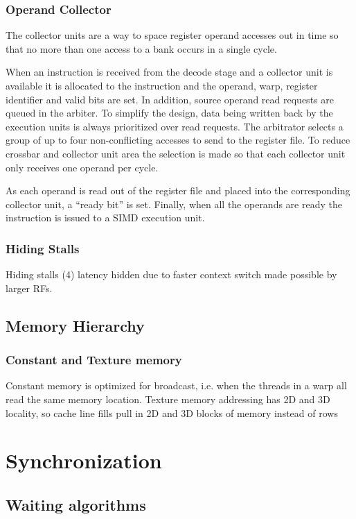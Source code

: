 \documentclass{article}
\begin{document}
\begin{multicols*}{2}
\subsubsection{Operand Collector}
The collector units are a way to space register operand accesses out in time so that no more than one access to a bank occurs in a single cycle. 
\medskip\par\noindent
When an instruction is received from the decode stage and a collector unit is available it is allocated to the instruction and the operand, warp, register identifier and valid bits are set. In addition, source operand read requests are queued in the arbiter. To simplify the design, data being written back by the execution units is always prioritized over read requests. The arbitrator selects a group of up to four non-conflicting accesses to send to the register file. To reduce crossbar and collector unit area the selection is made so that each collector unit only receives one operand per cycle.
\medskip\par\noindent
As each operand is read out of the register file and placed into the corresponding collector unit, a “ready bit” is set. Finally, when all the operands are ready the instruction is issued to a SIMD execution unit.

\subsubsection{Hiding Stalls}
Hiding stalls (4) latency hidden due to faster context switch made possible by larger RFs.

\subsection{Memory Hierarchy}
\subsubsection{Constant and Texture memory}
Constant memory is optimized for broadcast, i.e. when the threads in a warp all read the same memory location.
Texture memory addressing has 2D and 3D locality, so cache line fills pull in 2D and 3D blocks of memory instead of rows

\section{Synchronization}
\subsection{Waiting algorithms}

\end{multicols*}
\end{document}
